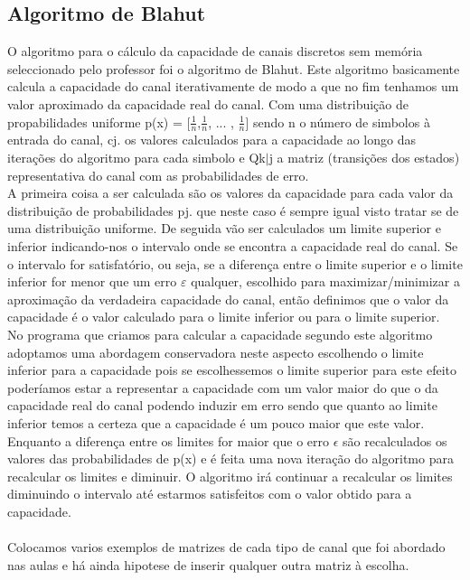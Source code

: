 \subsection{Algoritmo de Blahut}
\FloatBarrier
O algoritmo para o cálculo da capacidade de canais discretos sem memória seleccionado pelo professor foi o algoritmo de Blahut. Este algoritmo basicamente calcula a capacidade do canal iterativamente de modo a que no fim tenhamos um valor aproximado da capacidade real do canal.  Com uma distribuição de propabilidades uniforme p(x) = [$\frac{1}{n}$,$\frac{1}{n}$, ... , $\frac{1}{n}$] sendo n o número de simbolos à entrada do canal,  c{\tiny j.} os valores calculados para a capacidade ao longo das iterações do algoritmo para cada simbolo e Q{\tiny k$|$j} a matriz (transições dos estados) representativa do canal com as probabilidades de erro.\\
\FloatBarrier
A primeira coisa a ser calculada são os valores da capacidade para cada valor da distribuição de probabilidades p{\tiny j.} que neste caso é sempre igual visto tratar se de uma distribuição uniforme. De seguida vão ser calculados um limite superior e inferior indicando-nos o intervalo onde se encontra a capacidade real do canal. Se o intervalo for satisfatório, ou seja, se a diferença entre o limite superior e o limite inferior for menor que um erro $\varepsilon$ qualquer, escolhido para maximizar/minimizar a aproximação da verdadeira capacidade do canal, então definimos que o valor da capacidade é o valor calculado para o limite inferior ou para o limite superior. \\
\FloatBarrier
No programa que criamos para calcular a capacidade segundo este algoritmo adoptamos uma abordagem conservadora neste aspecto escolhendo o limite inferior para a capacidade pois se escolhessemos o limite superior para este efeito poderíamos estar a representar a capacidade com um valor maior do que o da capacidade real do canal podendo induzir em erro sendo que quanto ao limite inferior temos a certeza que a capacidade é um pouco maior que este valor. Enquanto a diferença entre os limites for maior que o erro $\epsilon$ são recalculados os valores das probabilidades de p(x) e é feita uma nova iteração do algoritmo para recalcular os limites e diminuir. O algoritmo irá continuar a recalcular os limites diminuindo o intervalo até estarmos satisfeitos com o valor obtido para a capacidade.\\
\\Colocamos varios exemplos de matrizes de cada tipo de canal que foi abordado nas aulas e há ainda hipotese de inserir qualquer outra matriz à escolha.

